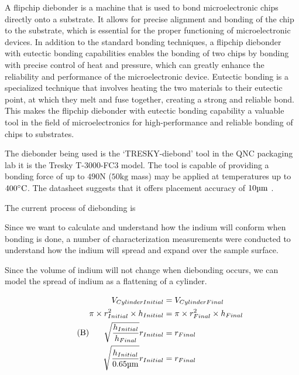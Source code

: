 A flipchip diebonder is a machine that is used to bond microelectronic chips directly onto a substrate. It allows for precise alignment and bonding of the chip to the substrate, which is essential for the proper functioning of microelectronic devices. In addition to the standard bonding techniques, a flipchip diebonder with eutectic bonding capabilities enables the bonding of two chips by bonding with precise control of heat and pressure, which can greatly enhance the reliability and performance of the microelectronic device. Eutectic bonding is a specialized technique that involves heating the two materials to their eutectic point, at which they melt and fuse together, creating a strong and reliable bond. This makes the flipchip diebonder with eutectic bonding capability a valuable tool in the field of microelectronics for high-performance and reliable bonding of chips to substrates.


The diebonder being used is the `TRESKY-diebond' tool in the QNC packaging lab it is the Tresky T-3000-FC3 model.
The tool is capable of providing a bonding force of up to $490 \unit{\newton}$ ($50 \unit{\kg}$ mass) may be applied at temperatures up to $400 \dC$. The datasheet suggests that it offers placement accuracy of $10\um$ \cite{diebonderDatasheet}.

The current process of diebonding is


Since we want to calculate and understand how the indium will conform when bonding is done, a number of characterization measurements were conducted to understand how the indium will spread and expand over the sample surface.

Since the volume of indium will not change when diebonding occurs, we can model the spread of indium as a flattening of a cylinder.

\begin{equation}\tag{B}
    \begin{split}
        V_{Cylinder Initial} &= V_{Cylinder Final} \\
        \pi \times r_{Initial}^2 \times h_{Initial} &= \pi \times r_{Final}^2 \times h_{Final} \\
        \sqrt{\frac{h_{Initial}}{h_{Final}}} r_{Initial} &= r_{Final} \\
        \sqrt{\frac{h_{Initial}}{ 0.65 \um}} r_{Initial} &= r_{Final}
    \end{split}
\end{equation}



